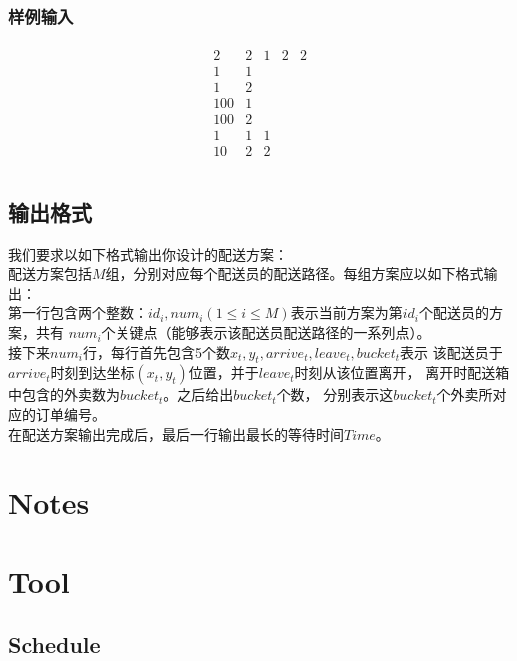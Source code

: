 \documentclass[hyperref,UTF8]{ctexart}
\theoremstyle{definition}
\theoremstyle{remark}
\numberwithin{equation}{subsection}
\begin{document}
\subsubsection{样例输入}
	
    \begin{gather*}
	\begin{matrix}
		2 &2 &1 &2 &2	\\
		1 &1 &\ &\ &\ 	\\
		1 &2 &\ &\ &\ 	\\
		100 &1 &\ &\ &\ 	\\
		100 &2 &\ &\ &\ 	\\
		1 &1 &1 &\ &\ 	\\
		10 &2 &2 &\ &\ 	\\
	\end{matrix}
    \end{gather*}
	
\subsection{输出格式}

	我们要求以如下格式输出你设计的配送方案：	\\
	配送方案包括$M$组，分别对应每个配送员的配送路径。每组方案应以如下格式输出：	\\
	第一行包含两个整数：$id_i, num_i(1 \le i \le M)$表示当前方案为第$id_i$个配送员的方案，共有
	$num_i$个关键点（能够表示该配送员配送路径的一系列点）。	\\
	接下来$num_i$行，每行首先包含5个数$x_t, y_t, arrive_t, leave_t, bucket_t$表示
	该配送员于$arrive_t$时刻到达坐标$(x_t, y_t)$位置，并于$leave_t$时刻从该位置离开，
	离开时配送箱中包含的外卖数为$bucket_t$。之后给出$bucket_t$个数，
	分别表示这$bucket_t$个外卖所对应的订单编号。	\\
	在配送方案输出完成后，最后一行输出最长的等待时间$Time$。

	
\section{Notes}	
\label{sec:notes}

\section{Tool}
\label{sec:tool}

\subsection{Schedule}
\end{document}
